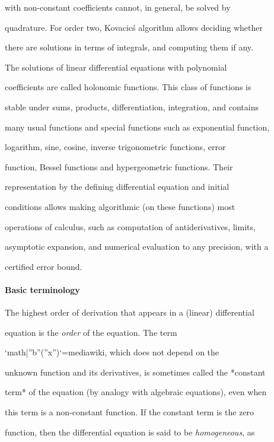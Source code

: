 with non-constant coefficients cannot, in general, be solved by

quadrature. For order two, Kovacic\'s algorithm allows deciding whether

there are solutions in terms of integrals, and computing them if any.



The solutions of linear differential equations with polynomial

coefficients are called holonomic functions. This class of functions is

stable under sums, products, differentiation, integration, and contains

many usual functions and special functions such as exponential function,

logarithm, sine, cosine, inverse trigonometric functions, error

function, Bessel functions and hypergeometric functions. Their

representation by the defining differential equation and initial

conditions allows making algorithmic (on these functions) most

operations of calculus, such as computation of antiderivatives, limits,

asymptotic expansion, and numerical evaluation to any precision, with a

certified error bound.



\paragraph{Basic terminology}



The highest order of derivation that appears in a (linear) differential

equation is the \textit{order} of the equation. The term

`{{math|''b''(''x'')}}`{=mediawiki}, which does not depend on the

unknown function and its derivatives, is sometimes called the *constant

term* of the equation (by analogy with algebraic equations), even when

this term is a non-constant function. If the constant term is the zero

function, then the differential equation is said to be \textit{homogeneous}, as

